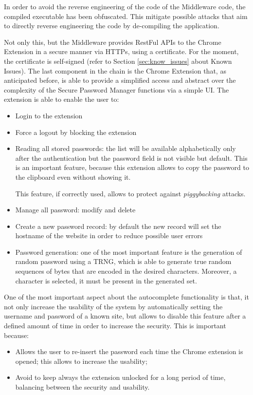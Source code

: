 In order to avoid the reverse engineering of the code of the Middleware code, the compiled executable has been obfuscated. This mitigate possible attacks that aim to directly reverse engineering the code by de-compiling the application.


Not only this, but the Middleware provides RestFul APIs to the Chrome Extension in a secure manner via HTTPs, using a certificate. For the moment, the certificate is self-signed (refer to Section \ref{sec:know_issues} about Known Issues).\newline\newline
The last component in the chain is the Chrome Extension that, as anticipated before, is able to provide a simplified access and abstract over the complexity of the Secure Password Manager functions via a simple UI. The extension is able to enable the user to:
\begin{itemize}
	\item Login to the extension
	\item Force a logout by blocking the extension
	\item Reading all stored passwords: the list will be available alphabetically only after the authentication but the password field is not visible but default. This is an important feature, because this extension allows to copy the password to the clipboard even without showing it.
	
	This feature, if correctly used, allows to protect against \textit{piggybacking} attacks.
	\item Manage all password: modify and delete
	\item Create a new password record: by default the new record will set the hostname of the website in order to reduce possible user errors
	\item Password generation: one of the most important feature is the generation of random password using a TRNG, which is able to generate true random sequences of bytes that are encoded in the desired characters. Moreover, a character is selected, it must be present in the generated set.
\end{itemize}
One of the most important aspect about the autocomplete functionality is that, it not only increase the usability of the system by automatically setting the username and password of a known site, but allows to disable this feature after a defined amount of time in order to increase the security. This is important because:
\begin{itemize}
	\item Allows the user to re-insert the password each time the Chrome extension is opened; this allows to increase the usability;
	\item Avoid to keep always the extension unlocked for a long period of time, balancing between the security and usability.
\end{itemize}

